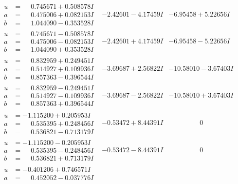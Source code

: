 \documentclass[1p]{elsarticle_modified}
\theoremstyle{definition}
\begin{document}
$$\begin{array}{c|c|c}
 \hline 
\begin{aligned}
u &= \phantom{-}0.745671 + 0.508578 I \\
a &= \phantom{-}0.475006 + 0.082153 I \\
b &= \phantom{-}1.044090 - 0.353528 I\end{aligned}
 & -2.42601 - 4.17459 I & -6.95458 + 5.22656 I \\ \hline\begin{aligned}
u &= \phantom{-}0.745671 - 0.508578 I \\
a &= \phantom{-}0.475006 - 0.082153 I \\
b &= \phantom{-}1.044090 + 0.353528 I\end{aligned}
 & -2.42601 + 4.17459 I & -6.95458 - 5.22656 I \\ \hline\begin{aligned}
u &= \phantom{-}0.832959 + 0.249451 I \\
a &= \phantom{-}0.514927 + 0.109936 I \\
b &= \phantom{-}0.857363 - 0.396544 I\end{aligned}
 & -3.69687 + 2.56822 I & -10.58010 - 3.67403 I \\ \hline\begin{aligned}
u &= \phantom{-}0.832959 - 0.249451 I \\
a &= \phantom{-}0.514927 - 0.109936 I \\
b &= \phantom{-}0.857363 + 0.396544 I\end{aligned}
 & -3.69687 - 2.56822 I & -10.58010 + 3.67403 I \\ \hline\begin{aligned}
u &= -1.115200 + 0.205953 I \\
a &= \phantom{-}0.535395 + 0.248456 I \\
b &= \phantom{-}0.536821 - 0.713179 I\end{aligned}
 & -0.53472 + 8.44391 I & \phantom{-0.000000 } 0 \\ \hline\begin{aligned}
u &= -1.115200 - 0.205953 I \\
a &= \phantom{-}0.535395 - 0.248456 I \\
b &= \phantom{-}0.536821 + 0.713179 I\end{aligned}
 & -0.53472 - 8.44391 I & \phantom{-0.000000 } 0 \\ \hline\begin{aligned}
u &= -0.401206 + 0.746571 I \\
a &= \phantom{-}0.452052 - 0.037776 I \\

\end{aligned}
\end{array}$$
\end{document}
